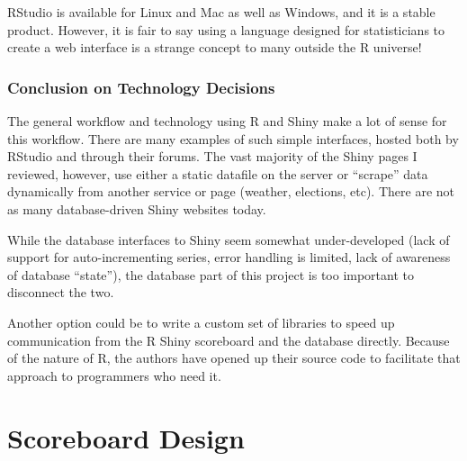 \documentclass[logos,parttoc,morelanguage=french,morelanguage=german]{orsay-memoire}
\begin{document}
RStudio is available for Linux and Mac as well as Windows, and it is a stable product. However, it is fair to say using a language designed for statisticians to create a web interface is a strange concept to many outside the R universe!

\section{Conclusion on Technology Decisions}
The general workflow and technology using R and Shiny make a lot of sense for this workflow. There are many examples of such simple interfaces, hosted both by RStudio and through their forums. The vast majority of the Shiny pages I reviewed, however, use either a static datafile on the server or ``scrape'' data dynamically from another service or page (weather, elections, etc). There are not as many database-driven Shiny websites today.

While the database interfaces to Shiny seem somewhat under-developed (lack of support for auto-incrementing series, error handling is limited, lack of awareness of database ``state''), the database part of this project is too important to disconnect the two.

Another option could be to write a custom set of libraries to speed up communication from the R Shiny scoreboard and the database directly. Because of the nature of R, the authors have opened up their source code to facilitate that approach to programmers who need it.


\part{Scoreboard Design}
\end{document}
